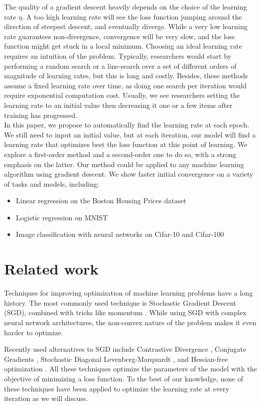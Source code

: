 \documentclass{article}
\begin{document}
  The quality of a gradient descent heavily depends on the choice of the learning rate $\eta$. A too high learning rate will see the loss function jumping around the direction of steepest descent, and eventually diverge. While a very low learning rate guarantees non-divergence, convergence will be very slow, and the loss function might get stuck in a local minimum. Choosing an ideal learning rate requires an intuition of the problem. Typically, researchers would start by performing a random search or a line-search over a set of different orders of magnitude of learning rates, but this is long and costly. Besides, these methods assume a fixed learning rate over time, as doing one search per iteration would require exponential computation cost. Usually, we see researchers setting the learning rate to an initial value then decreasing it one or a few items after training has progressed.\\
  
  In this paper, we propose to automatically find the learning rate at each epoch. We still need to input an initial value, but at each iteration, our model will find a learning rate that optimizes best the loss function at this point of learning. We explore a first-order method and a second-order one to do so, with a strong emphasis on the latter. Our method could be applied to any machine learning algorithm using gradient descent. We show faster initial convergence on a variety of tasks and models, including:
  \begin{itemize}
  	\item Linear regression on the Boston Housing Prices dataset
  	\item Logistic regression on MNIST
  	\item Image classification with neural networks on Cifar-10 and Cifar-100
  \end{itemize} 
  
  \section{Related work}
  
  Techniques for improving optimization of machine learning problems have a long history. The most commonly used technique is Stochastic Gradient Descent (SGD), combined with tricks like momentum \cite{polyak1964some}. While using SGD with complex neural network architectures, the non-convex nature of the problem makes it even harder to optimize. 
  
  Recently used alternatives to SGD include Contrastive Divergence \cite{hinton2006training}, Conjugate Gradients \cite{hinton2006reducing}, Stochastic Diagonal Levenberg-Marquardt \cite{lecun1998gradient}, and Hessian-free optimization \cite{martens2010deep}. All these techniques optimize the parameters of the model with the objective of minimizing a loss function. To the best of our knowledge, none of these techniques have been applied to optimize the learning rate at every iteration as we will discuss.
  
\end{document}
